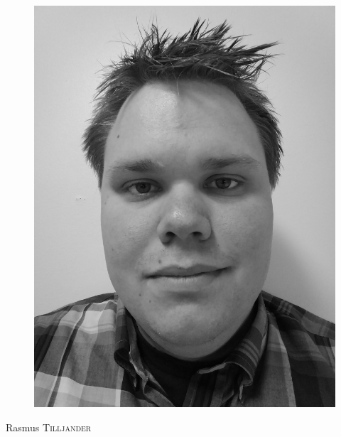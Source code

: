 \documentclass[a4paper,10pt]{article}
\begin{document}
\pagestyle{empty} %

\par{	
    
    \begin{figure}
    \includegraphics[scale=0.04]{Grayscale.pdf}
    \end{figure}
    
    \Huge Rasmus \textsc{Tilljander}
	\bigskip
\par}
	

\end{document}

